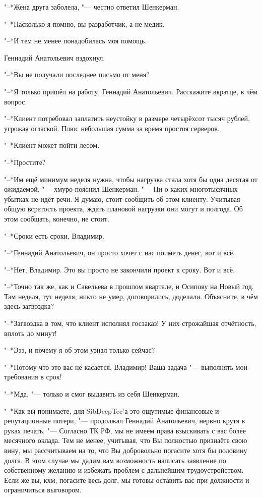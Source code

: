 "--*Жена друга заболела, "--- честно ответил Шенкерман.

"--*Насколько я помню, вы разработчик, а не медик.

"--*И тем не менее понадобилась моя помощь.

Геннадий Анатольевич вздохнул.

"--*Вы не получали последнее письмо от меня?

"--*Я только пришёл на работу, Геннадий Анатольевич.
Расскажите вкратце, в чём вопрос.

"--*Клиент потребовал заплатить неустойку в размере четырёхсот тысяч рублей, угрожая оглаской.
Плюс небольшая сумма за время простоя серверов.

"--*Клиент может пойти лесом.

"--*Простите?

"--*Им ещё минимум неделя нужна, чтобы нагрузка стала хотя бы одна десятая от ожидаемой, "--- хмуро пояснил Шенкерман.
"--- Ни о каких многотысячных убытках не идёт речи.
Я думаю, стоит сообщить об этом клиенту.
Учитывая общую всратость проекта, ждать плановой нагрузки они могут и полгода.
Об этом сообщать, конечно, не стоит.

"--*Сроки есть сроки, Владимир.

"--*Геннадий Анатольевич, он просто хочет с нас поиметь денег, вот и всё.

"--*Нет, Владимир.
Это вы просто не закончили проект к сроку.
Вот и всё.

"--*Точно так же, как и Савельева в прошлом квартале, и Осипову на Новый год.
Там неделя, тут неделя, никто не умер, договорились, доделали.
Объясните, в чём здесь загвоздка?

"--*Загвоздка в том, что клиент исполнял госзаказ!
У них строжайшая отчётность, вплоть до минут!

"--*Эээ, и почему я об этом узнал только сейчас?

"--*Потому что это вас не касается, Владимир!
Ваша задача "--- выполнять мои требования в срок!

"--*Мда, "--- только и смог выдавить из себя Шенкерман.

"--*Как вы понимаете, для SibDeepTec'а это ощутимые финансовые и репутационные потери, "--- продолжал Геннадий Анатольевич, нервно крутя в руках печать.
"--- Согласно ТК РФ, мы не имеем права взыскивать с вас более месячного оклада.
Тем не менее, учитывая, что Вы полностью признаёте свою вину, мы рассчитываем на то, что Вы добровольно погасите хотя бы половину долга.
В этом случае мы дадим вам возможность написать заявление по собственному желанию и избежать проблем с дальнейшим трудоустройством.
Если же вы, кхм, погасите весь долг, мы готовы оставить вас при должности и ограничиться выговором.

